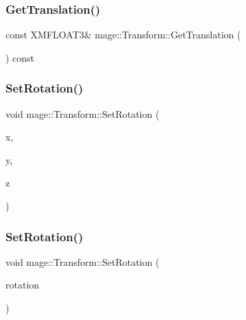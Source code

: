 \hypertarget{structmage_1_1_transform_af6b58761ec19c3721bbf8e8e5d4513e9}{}\label{structmage_1_1_transform_af6b58761ec19c3721bbf8e8e5d4513e9} 
\subsubsection{\texorpdfstring{Get\+Translation()}{GetTranslation()}}
{\footnotesize\ttfamily const X\+M\+F\+L\+O\+A\+T3\& mage\+::\+Transform\+::\+Get\+Translation (\begin{DoxyParamCaption}{ }\end{DoxyParamCaption}) const}

\hypertarget{structmage_1_1_transform_a8e8fffa4ae9bc969196151daf4502421}{}\label{structmage_1_1_transform_a8e8fffa4ae9bc969196151daf4502421} 
\subsubsection{\texorpdfstring{Set\+Rotation()}{SetRotation()}\hspace{0.1cm}{\footnotesize\ttfamily [1/2]}}
{\footnotesize\ttfamily void mage\+::\+Transform\+::\+Set\+Rotation (\begin{DoxyParamCaption}\item[{float}]{x,  }\item[{float}]{y,  }\item[{float}]{z }\end{DoxyParamCaption})}

\hypertarget{structmage_1_1_transform_a6b15a1591a10fe2984b7e8b0b8c92bd5}{}\label{structmage_1_1_transform_a6b15a1591a10fe2984b7e8b0b8c92bd5} 
\subsubsection{\texorpdfstring{Set\+Rotation()}{SetRotation()}\hspace{0.1cm}{\footnotesize\ttfamily [2/2]}}
{\footnotesize\ttfamily void mage\+::\+Transform\+::\+Set\+Rotation (\begin{DoxyParamCaption}\item[{const X\+M\+F\+L\+O\+A\+T3 \&}]{rotation }\end{DoxyParamCaption})}

